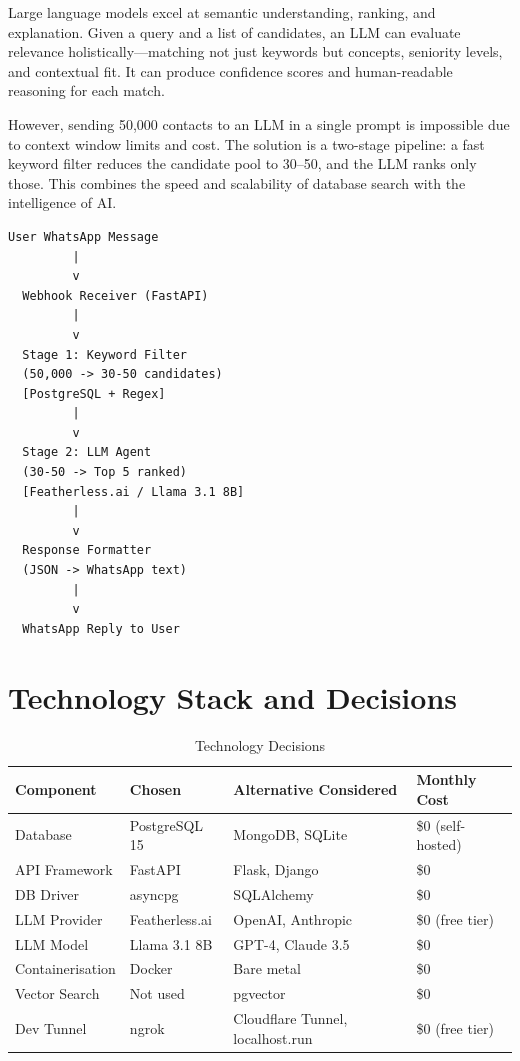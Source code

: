 \documentclass[12pt, a4paper]{report}
\begin{document}
Large language models excel at semantic understanding, ranking, and explanation. Given a query and a list of candidates, an LLM can evaluate relevance holistically---matching not just keywords but concepts, seniority levels, and contextual fit. It can produce confidence scores and human-readable reasoning for each match.

However, sending 50,000 contacts to an LLM in a single prompt is impossible due to context window limits and cost. The solution is a two-stage pipeline: a fast keyword filter reduces the candidate pool to 30--50, and the LLM ranks only those. This combines the speed and scalability of database search with the intelligence of AI.

\begin{verbatim}
User WhatsApp Message
         |
         v
  Webhook Receiver (FastAPI)
         |
         v
  Stage 1: Keyword Filter
  (50,000 -> 30-50 candidates)
  [PostgreSQL + Regex]
         |
         v
  Stage 2: LLM Agent
  (30-50 -> Top 5 ranked)
  [Featherless.ai / Llama 3.1 8B]
         |
         v
  Response Formatter
  (JSON -> WhatsApp text)
         |
         v
  WhatsApp Reply to User
\end{verbatim}

\chapter{Technology Stack and Decisions}

\begin{table}[H]
\centering
\begin{tabular}{p{3cm}p{3cm}p{4cm}p{3cm}}
\toprule
\textbf{Component} & \textbf{Chosen} & \textbf{Alternative Considered} & \textbf{Monthly Cost} \\
\midrule
Database & PostgreSQL 15 & MongoDB, SQLite & \$0 (self-hosted) \\
API Framework & FastAPI & Flask, Django & \$0 \\
DB Driver & asyncpg & SQLAlchemy & \$0 \\
LLM Provider & Featherless.ai & OpenAI, Anthropic & \$0 (free tier) \\
LLM Model & Llama 3.1 8B & GPT-4, Claude 3.5 & \$0 \\
Containerisation & Docker & Bare metal & \$0 \\
Vector Search & Not used & pgvector & \$0 \\
Dev Tunnel & ngrok & Cloudflare Tunnel, localhost.run & \$0 (free tier) \\
\bottomrule
\end{tabular}
\caption{Technology Decisions}
\end{table}
\end{document}
